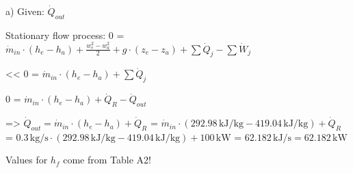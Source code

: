 a) Given: \( \dot{Q}_{out} \)  

Stationary flow process:  
0 = \( \dot{m}_{in} \cdot (h_e - h_a) + \frac{w_e^2 - w_a^2}{2} + g \cdot (z_e - z_a) + \sum \dot{Q}_j - \sum \dot{W}_j \)  

<< 0 = \( \dot{m}_{in} \cdot (h_e - h_a) + \sum \dot{Q}_j \)  

0 = \( \dot{m}_{in} \cdot (h_e - h_a) + \dot{Q}_R - \dot{Q}_{out} \)  

=> \( \dot{Q}_{out} = \dot{m}_{in} \cdot (h_e - h_a) + \dot{Q}_R \)  
= \( \dot{m}_{in} \cdot (292.98 \, \text{kJ/kg} - 419.04 \, \text{kJ/kg}) + \dot{Q}_R \)  
= \( 0.3 \, \text{kg/s} \cdot (292.98 \, \text{kJ/kg} - 419.04 \, \text{kJ/kg}) + 100 \, \text{kW} \)  
= \( 62.182 \, \text{kJ/s} = 62.182 \, \text{kW} \)  

Values for \( h_f \) come from Table A2!